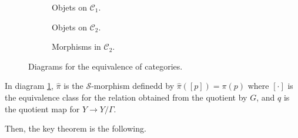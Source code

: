 \begin{figure}[htbp]
    \renewcommand\figurename{Diagram}
    \centering
    \begin{subfigure}[b]{0.32\textwidth}
        \centering
        \caption{Objets on \(\mathcal{C}_1\).}
        \label{diag_c1}
    \end{subfigure}%
        \begin{subfigure}[b]{0.32\textwidth}
        \centering
        \caption{Objets on \(\mathcal{C}_2\).}
        \label{diag_c22}
    \end{subfigure}%
    \begin{subfigure}[b]{0.32\textwidth}
        \centering
        \caption{Morphisms in \(\mathcal{C}_2\).}
        \label{diag_c2}
    \end{subfigure}
    \caption{Diagrams for the equivalence of categories.}
\end{figure}
In diagram \ref{diag_c1}, \(\hat{\pi}\) is the \(\mathcal{S}\)-morphism definedd by \(\hat{\pi}([p])=\pi(p)\) where \([\cdot]\) is the equivalence class for the relation obtained from the quotient by \(G\), and \(q\) is the quotient map for \(Y \to Y/\Gamma\). 

Then, the key theorem is the following.

